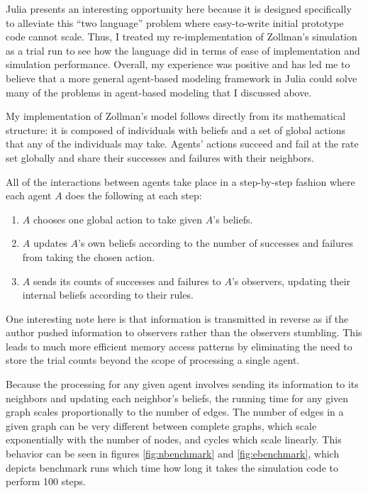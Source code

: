 Julia presents an interesting opportunity here because it is designed
specifically to alleviate this ``two language'' problem where
easy-to-write initial prototype code cannot scale. Thus, I treated my
re-implementation of Zollman's simulation as a trial run to see how the
language did in terms of ease of implementation and simulation
performance. Overall, my experience was positive and has led me to
believe that a more general agent-based modeling framework in Julia
could solve many of the problems in agent-based modeling that I
discussed above.

My implementation of Zollman's model follows directly from its
mathematical structure: it is composed of individuals with beliefs and a
set of global actions that any of the individuals may take. Agents'
actions succeed and fail at the rate set globally and share their
successes and failures with their neighbors.

All of the interactions between agents take place in a step-by-step
fashion where each agent \(A\) does the following at each step:

\begin{enumerate}
\def\labelenumi{\arabic{enumi}.}
\tightlist
\item
  \(A\) chooses one global action to take given \(A\)'s beliefs.
\item
  \(A\) updates \(A\)'s own beliefs according to the number of successes
  and failures from taking the chosen action.
\item
  \(A\) sends its counts of successes and failures to \(A\)'s observers,
  updating their internal beliefs according to their rules.
\end{enumerate}

One interesting note here is that information is transmitted in reverse
as if the author pushed information to observers rather than the
observers stumbling. This leads to much more efficient memory access
patterns by eliminating the need to store the trial counts beyond the
scope of processing a single agent.

Because the processing for any given agent involves sending its
information to its neighbors and updating each neighbor's beliefs, the
running time for any given graph scales proportionally to the number of
edges. The number of edges in a given graph can be very different
between complete graphs, which scale exponentially with the number of
nodes, and cycles which scale linearly. This behavior can be seen in
figures \ref{fig:nbenchmark} and \ref{fig:ebenchmark}, which depicts
benchmark runs which time how long it takes the simulation code to
perform 100 steps.

